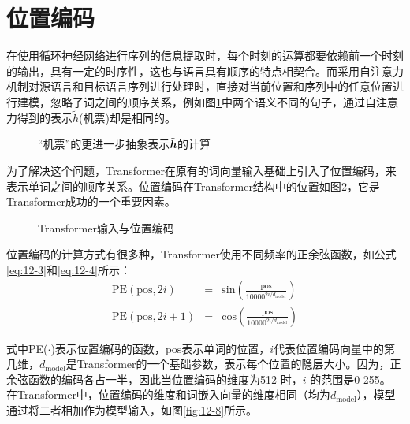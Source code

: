 \sectionnewpage
\section{位置编码}

\parinterval 在使用循环神经网络进行序列的信息提取时，每个时刻的运算都要依赖前一个时刻的输出，具有一定的时序性，这也与语言具有顺序的特点相契合。而采用自注意力机制对源语言和目标语言序列进行处理时，直接对当前位置和序列中的任意位置进行建模，忽略了词之间的顺序关系，例如图\ref{fig:12-6}中两个语义不同的句子，通过自注意力得到的表示$\tilde{h}$(机票)却是相同的。

\begin{figure}[htp]
\centering

\caption{“机票”的更进一步抽象表示$\tilde{\textbf{\em h}}$的计算}
\label{fig:12-6}
\end{figure}

\parinterval 为了解决这个问题，Transformer在原有的词向量输入基础上引入了位置编码，来表示单词之间的顺序关系。位置编码在Transformer结构中的位置如图\ref{fig:12-7}，它是Transformer成功的一个重要因素。

\begin{figure}[htp]
\centering

\caption{Transformer输入与位置编码}
\label{fig:12-7}
\end{figure}

\parinterval 位置编码的计算方式有很多种，Transformer使用不同频率的正余弦函数，如公式\eqref{eq:12-3}和\eqref{eq:12-4}所示：
\begin{eqnarray}
\textrm{PE}(\textrm{pos},2i) & = & \textrm{sin} (\frac{\textrm{pos}}{10000^{2i/d_{\textrm{model}}}}) \label{eq:12-3} \\
\textrm{PE}(\textrm{pos},2i+1) & = & \textrm{cos} (\frac{\textrm{pos}}{10000^{2i/d_{\textrm{model}}}}) \label{eq:12-4}
\end{eqnarray}

\noindent 式中PE($\cdot$)表示位置编码的函数，$\textrm{pos}$表示单词的位置，$i$代表位置编码向量中的第几维，$d_{\textrm{model}}$是Transformer的一个基础参数，表示每个位置的隐层大小。因为，正余弦函数的编码各占一半，因此当位置编码的维度为512 时，$i$ 的范围是0-255。 在Transformer中，位置编码的维度和词嵌入向量的维度相同（均为$d_{\textrm{model}}$），模型通过将二者相加作为模型输入，如图\ref{fig:12-8}所示。

